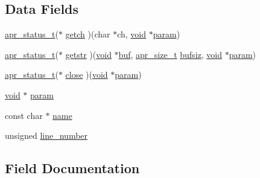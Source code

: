 \subsection*{Data Fields}
\begin{DoxyCompactItemize}
\item 
\hyperlink{group__apr__errno_gaa5105fa83cc322f09382292db8b47593}{apr\+\_\+status\+\_\+t}($\ast$ \hyperlink{structap__configfile__t_a7a23ce815b3569b7e7f3edcbe6db0993}{getch} )(char $\ast$ch, \hyperlink{group__MOD__ISAPI_gacd6cdbf73df3d9eed42fa493d9b621a6}{void} $\ast$\hyperlink{mod__mime_8c_a5c0eef538232854ead9eb8af12c04938}{param})
\item 
\hyperlink{group__apr__errno_gaa5105fa83cc322f09382292db8b47593}{apr\+\_\+status\+\_\+t}($\ast$ \hyperlink{structap__configfile__t_aec74a3f56170a272f7a3a662aa6aca27}{getstr} )(\hyperlink{group__MOD__ISAPI_gacd6cdbf73df3d9eed42fa493d9b621a6}{void} $\ast$\hyperlink{group__APR__Util__Bucket__Brigades_gae92da6cbed6002407731bd51f7c6b984}{buf}, \hyperlink{group__apr__platform_gaaa72b2253f6f3032cefea5712a27540e}{apr\+\_\+size\+\_\+t} \hyperlink{group__APACHE__CORE__PROTO_gab5121d4d91ca81860ed7c296210087f0}{bufsiz}, \hyperlink{group__MOD__ISAPI_gacd6cdbf73df3d9eed42fa493d9b621a6}{void} $\ast$\hyperlink{mod__mime_8c_a5c0eef538232854ead9eb8af12c04938}{param})
\item 
\hyperlink{group__apr__errno_gaa5105fa83cc322f09382292db8b47593}{apr\+\_\+status\+\_\+t}($\ast$ \hyperlink{structap__configfile__t_acf2316152bf95bdcfbc7abb97a50945c}{close} )(\hyperlink{group__MOD__ISAPI_gacd6cdbf73df3d9eed42fa493d9b621a6}{void} $\ast$\hyperlink{mod__mime_8c_a5c0eef538232854ead9eb8af12c04938}{param})
\item 
\hyperlink{group__MOD__ISAPI_gacd6cdbf73df3d9eed42fa493d9b621a6}{void} $\ast$ \hyperlink{structap__configfile__t_ac539aebe520d927e696014cf4a515f5b}{param}
\item 
const char $\ast$ \hyperlink{structap__configfile__t_aaac6a6cdb23bd7e2f24de828d06e6c2e}{name}
\item 
unsigned \hyperlink{structap__configfile__t_a8c57bd7a8eb6e2133eba97d4ee08cfdb}{line\+\_\+number}
\end{DoxyCompactItemize}


\subsection{Field Documentation}

